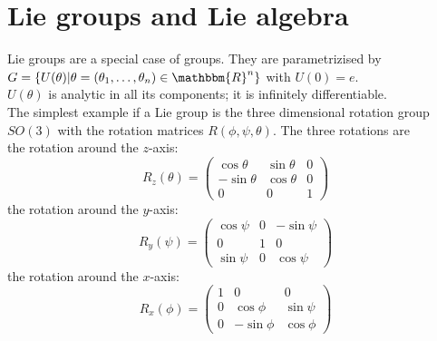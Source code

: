 \documentclass{include/thesisclass}
\newcommand{\Mat}[9]{\begin{pmatrix}#1&#2&#3\\#4&#5&#6\\#7&#8&#9\end{pmatrix}}
\begin{document}
\section{Lie groups and Lie algebra}
Lie groups are a special case of groups. They are parametrizised by $G = \{ U(\theta)| \theta = ( \theta_1, \ldots, \theta_n) \in \mathbbm{R}^n\}$ with $U(0) = e$. \\
$U(\theta)$ is analytic in all its components; it is infinitely differentiable.\\
The simplest example if a Lie group is the three dimensional rotation group $SO(3)$ with the rotation matrices $R(\phi,\psi,\theta)$. The three rotations are\\
the rotation around the $z$-axis:
\[ R_z(\theta) = \Mat{\cos\theta}{\sin\theta}{0}{- \sin\theta}{\cos\theta}{0}{0}{0}{1}\]
the rotation around the $y$-axis:
\[ R_y(\psi) = \Mat{\cos\psi}{0}{-\sin\psi}{0}{1}{0}{\sin\psi}{0}{\cos\psi}\]
the rotation around the $x$-axis:
\[ R_x(\phi) = \Mat{1}{0}{0}{0}{\cos\phi}{\sin\psi}{0}{-\sin\phi}{\cos\phi}\]
\end{document}
